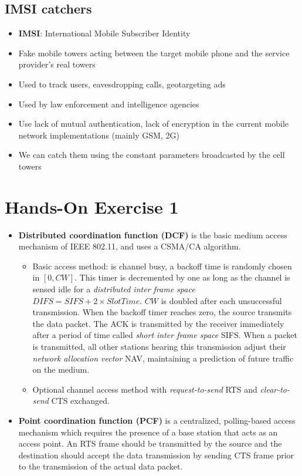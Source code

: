 \subsection{IMSI catchers}
\begin{itemize}
	\item \textbf{IMSI}: International Mobile Subscriber Identity
	\item Fake mobile towers acting between the target mobile phone and the service provider's real towers
	\item Used to track users, eavesdropping calls, geotargeting ads
	\item Used by law enforcement and intelligence agencies
	\item Use lack of mutual authentication, lack of encryption in the current mobile network implementations (mainly GSM, 2G)
	\item We can catch them using the constant parameters broadcasted by the cell towers
\end{itemize}

	\section{Hands-On Exercise 1}
	\begin{itemize}
		\item \textbf{Distributed coordination function (DCF)} is the basic medium access mechanism of IEEE 802.11, and uses a CSMA/CA algorithm.
		\begin{itemize}
			\item Basic access method: is channel busy, a backoff time is randomly chosen in $[0, CW]$. This timer is decremented by one as long as the channel is sensed idle for a \textit{distributed inter frame space} $DIFS = SIFS + 2 \times SlotTime$. $CW$ is doubled after each unsuccessful transmission. When the backoff timer reaches zero, the source transmits the data packet. The ACK is transmitted by the receiver immediately after a period of time called \textit{short inter frame space} SIFS. When a packet is transmitted, all other stations hearing this transmission adjust their \textit{network allocation vector} NAV, maintaining a prediction of future traffic on the medium.
			\item Optional channel access method with \textit{request-to-send} RTS and \textit{clear-to-send} CTS exchanged.
		\end{itemize}
		\item \textbf{Point coordination function (PCF)} is a centralized, polling-based access mechanism which requires the presence of a base station that acts as an access point. An RTS frame should be transmitted by the source and the destination should accept the data transmission by sending CTS frame prior to the transmission of the actual data packet.
	\end{itemize}






